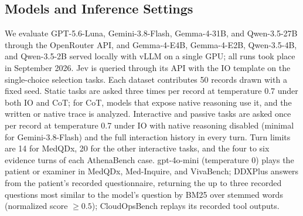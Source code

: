 



\subsection{Models and Inference Settings}
\label{app:model_inference_settings}

We evaluate GPT-5.6-Luna, Gemini-3.8-Flash, Gemma-4-31B, and Qwen-3.5-27B through the OpenRouter API, and Gemma-4-E4B, Gemma-4-E2B, Qwen-3.5-4B, and Qwen-3.5-2B served locally with vLLM on a single GPU; all runs took place in September 2026. Jev is queried through its API with the IO template on the single-choice selection tasks. Each dataset contributes 50 records drawn with a fixed seed. Static tasks are asked three times per record at temperature 0.7 under both IO and CoT; for CoT, models that expose native reasoning use it, and the written or native trace is analyzed. Interactive and passive tasks are asked once per record at temperature 0.7 under IO with native reasoning disabled (minimal for Gemini-3.8-Flash) and the full interaction history in every turn. Turn limits are 14 for MedQDx, 20 for the other interactive tasks, and the four to six evidence turns of each AthenaBench case. gpt-4o-mini (temperature 0) plays the patient or examiner in MedQDx, Med-Inquire, and VivaBench; DDXPlus answers from the patient's recorded questionnaire, returning the up to three recorded questions most similar to the model's question by BM25 over stemmed words (normalized score $\geq 0.5$); CloudOpsBench replays its recorded tool outputs.


